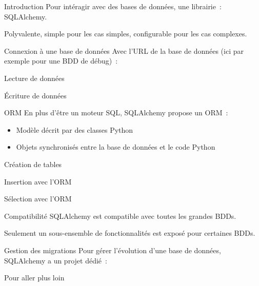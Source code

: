 \begin{frame}{Introduction}
  Pour intéragir avec des bases de données, une librairie~: SQLAlchemy.

  Polyvalente, simple pour les cas simples, configurable pour les cas complexes.
\end{frame}

\begin{frame}{Connexion à une base de données}
  Avec l'URL de la base de données (ici par exemple pour une BDD de débug)~:

\end{frame}

\begin{frame}{Lecture de données}
\end{frame}

\begin{frame}{Écriture de données}
\end{frame}

\begin{frame}{ORM}
  En plus d'être un moteur SQL, SQLAlchemy propose un ORM~:

  \begin{itemize}
    \item Modèle décrit par des classes Python
    \item Objets synchronisés entre la base de données et le code Python
  \end{itemize}
\end{frame}

\begin{frame}{Création de tables}
\end{frame}

\begin{frame}{Insertion avec l'ORM}
\end{frame}

\begin{frame}{Sélection avec l'ORM}
\end{frame}

\begin{frame}{Compatibilité}
  SQLAlchemy est compatible avec toutes les grandes BDDs.

  Seulement un sous-ensemble de fonctionnalités est exposé pour certaines BDDs.
\end{frame}

\begin{frame}{Gestion des migrations}
  Pour gérer l'évolution d'une base de données, SQLAlchemy a un projet dédié~:

\end{frame}

\begin{frame}{Pour aller plus loin}
\end{frame}
